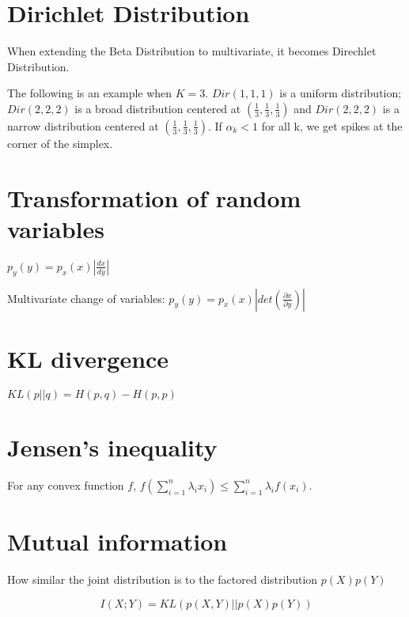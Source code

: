 \documentclass{article}
\begin{document}
\section{Dirichlet Distribution}
When extending the Beta Distribution to multivariate, it becomes Direchlet Distribution.

The following is an example when $K=3$. $Dir(1,1,1)$ is a uniform distribution; $Dir(2,2,2)$ is a broad distribution centered at $(\frac{1}{3},\frac{1}{3},\frac{1}{3})$ and $Dir(2,2,2)$ is a narrow distribution centered at $(\frac{1}{3},\frac{1}{3},\frac{1}{3})$.
If $\alpha_k < 1$ for all k, we get spikes at the corner of the simplex.

\section{Transformation of random variables}

$p_y(y) = p_x(x) |\frac{dx}{dy}|$

Multivariate change of variables: $p_y(y) = p_x(x) |det(\frac{\partial x}{ \partial y})|$

\section{KL divergence}
$KL(p||q) = H(p, q) - H(p, p)$

\section{Jensen's inequality}
For any convex function $f$, $f(\sum_{i=1}^n \lambda_i x_i) \leq \sum_{i=1}^n \lambda_i f(x_i)$.

\section{Mutual information}
How similar the joint distribution is to the factored distribution $p(X) p(Y)$

$$I(X;Y) = KL(p(X, Y)||p(X)p(Y))$$
\end{document}
